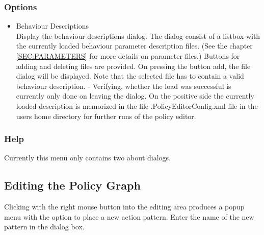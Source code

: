 \subsubsection{Options}
\begin{itemize}
\item Behaviour Descriptions \\
  Display the behaviour descriptions dialog. The dialog consist of a
  listbox with the currently loaded behaviour parameter description
  files. (See the chapter \ref{SEC:PARAMETERS} for more details on
  parameter files.) Buttons for adding and deleting files are
  provided. On pressing the button add, the file dialog will be
  displayed. Note that the selected file has to contain a valid
  behaviour description. - Verifying, whether the load was successful
  is currently only done on leaving the dialog. On the positive side
  the currently loaded description is memorized in the file
  .PolicyEditorConfig.xml file in the users home directory for further
  runs of the policy editor.
\end{itemize}
\subsubsection{Help}
Currently this menu only contains two about dialogs.

\subsection{Editing the Policy Graph}

Clicking with the right mouse button into the editing area produces
a popup menu with the option to place a new action pattern. Enter the
name of the new pattern in the dialog box.

